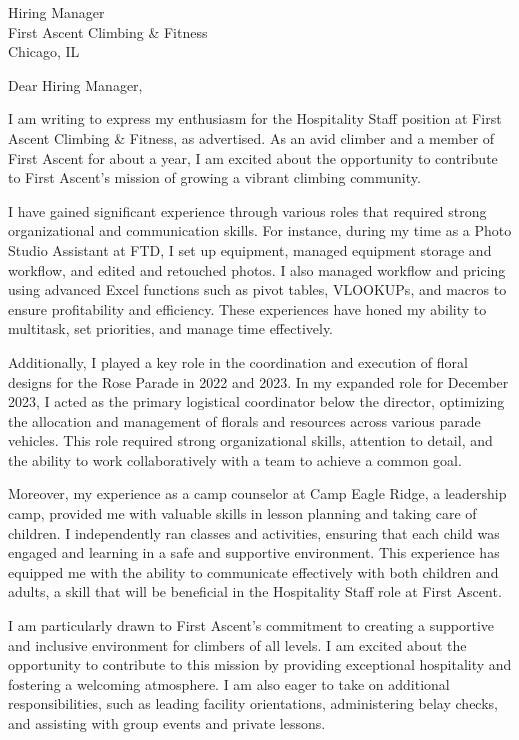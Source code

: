 \documentclass{letter}
\begin{document}
\begin{letter}{Hiring Manager\\First Ascent Climbing \& Fitness\\Chicago, IL}

\opening{Dear Hiring Manager,}

I am writing to express my enthusiasm for the Hospitality Staff position at First Ascent Climbing \& Fitness, as advertised. As an avid climber and a member of First Ascent for about a year, I am excited about the opportunity to contribute to First Ascent's mission of growing a vibrant climbing community.

I have gained significant experience through various roles that required strong organizational and communication skills. For instance, during my time as a Photo Studio Assistant at FTD, I set up equipment, managed equipment storage and workflow, and edited and retouched photos. I also managed workflow and pricing using advanced Excel functions such as pivot tables, VLOOKUPs, and macros to ensure profitability and efficiency. These experiences have honed my ability to multitask, set priorities, and manage time effectively.

Additionally, I played a key role in the coordination and execution of floral designs for the Rose Parade in 2022 and 2023. In my expanded role for December 2023, I acted as the primary logistical coordinator below the director, optimizing the allocation and management of florals and resources across various parade vehicles. This role required strong organizational skills, attention to detail, and the ability to work collaboratively with a team to achieve a common goal.

Moreover, my experience as a camp counselor at Camp Eagle Ridge, a leadership camp, provided me with valuable skills in lesson planning and taking care of children. I independently ran classes and activities, ensuring that each child was engaged and learning in a safe and supportive environment. This experience has equipped me with the ability to communicate effectively with both children and adults, a skill that will be beneficial in the Hospitality Staff role at First Ascent.

I am particularly drawn to First Ascent's commitment to creating a supportive and inclusive environment for climbers of all levels. I am excited about the opportunity to contribute to this mission by providing exceptional hospitality and fostering a welcoming atmosphere. I am also eager to take on additional responsibilities, such as leading facility orientations, administering belay checks, and assisting with group events and private lessons.


\end{letter}
\end{document}
